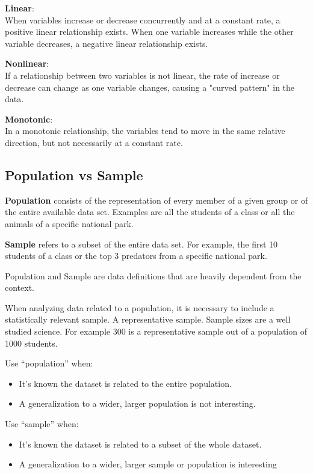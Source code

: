 \documentclass{article}
\begin{document}
\textbf{Linear}: \\ 
When variables increase or decrease concurrently and at a constant rate, a positive linear relationship exists.
When one variable increases while the other variable decreases, a negative linear relationship exists.

\textbf{Nonlinear}: \\
If a relationship between two variables is not linear, the rate of increase or decrease can change as one variable changes, causing a "curved pattern" in the data.

\textbf{Monotonic}: \\
In a monotonic relationship, the variables tend to move in the same relative direction, but not necessarily at a constant rate.

\subsection{Population vs Sample}

\textbf{Population} consists of the representation of every member of a given group or of the entire available data set.
Examples are all the students of a class or all the animals of a specific national park.

\textbf{Sample} refers to a subset of the entire data set. 
For example, the first 10 students of a class or the top 3 predators from a specific national park.

Population and Sample are data definitions that are heavily dependent from the context.

When analyzing data related to a population, it is necessary to include a statistically relevant sample. A representative sample. 
Sample sizes are a well studied science. 
For example 300 is a representative sample out of a population of 1000 students.

Use “population” when:
\begin{itemize}
    \item It’s known the dataset is related to the entire population.
    \item A generalization to a wider, larger population is not interesting.
\end{itemize}

Use “sample” when:
\begin{itemize}
    \item It’s known the dataset is related to a subset of the whole dataset.
    \item A generalization to a wider, larger sample or population is interesting
\end{itemize}
\end{document}
